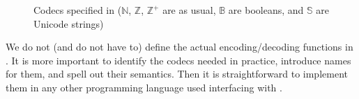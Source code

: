 \begin{figure}[ht]\centering
  \caption[List of Codecs]{
    Codecs specified in \mmt ($\mathbb{N}$, $\mathbb{Z}$, $\mathbb{Z}^{+}$ are as usual, $\mathbb{B}$ are booleans, and
    $\mathbb{S}$ are Unicode strings)
  }
  \label{fig:codecs}
\end{figure}

We do not (and do not have to) define the actual encoding/decoding functions in \ommt.
It is more important to identify the codecs needed in practice, introduce names for them, and spell out their semantics.
Then it is straightforward to implement them in any other programming language used interfacing with \lmfdb.

